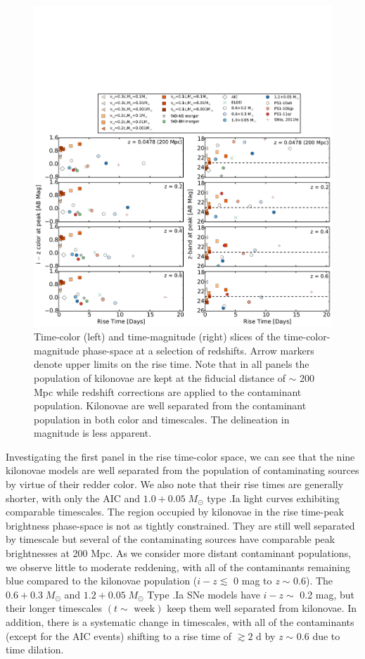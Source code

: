 \begin{figure}[t!]
\centering
\includegraphics[trim= 0 0 0 250 ,clip,width=\textwidth]{./figs/chapter2/ch2_f3.pdf}
\caption{Time-color (left) and time-magnitude (right) slices of the time-color-magnitude phase-space at a selection of redshifts. Arrow markers denote upper limits on the rise time. Note that in all panels the population of kilonovae are kept at the fiducial distance of $\sim$ 200 Mpc while redshift corrections are applied to the contaminant population. Kilonovae are well separated from the contaminant population in both color and timescales. The delineation in magnitude is less apparent.}
\label{fig:ch2_phase}
\end{figure}

Investigating the first panel in the rise time-color space, we can see that the nine kilonovae models are well separated from the population of contaminating sources by virtue of their redder color. We also note that their rise times are generally shorter, with only the AIC and $1.0+0.05\;M_{\odot}$ type .Ia light curves exhibiting comparable timescales. The region occupied by kilonovae in the rise time-peak brightness phase-space is not as tightly constrained. They are still well separated by timescale but several of the contaminating sources have comparable peak brightnesses at 200 Mpc. As we consider more distant contaminant populations, we observe little to moderate reddening, with all of the contaminants remaining blue compared to the kilonovae population ($i-z\lesssim$ 0 mag to {\em z} $\sim$ 0.6). The $0.6+0.3\;M_{\odot}$ and $1.2+0.05\;M_{\odot}$ Type .Ia SNe models have $i-z\sim$ 0.2 mag, but their longer timescales $(t\sim\text{ week})$ keep them well separated from kilonovae. In addition, there is a systematic change in timescales, with all of the contaminants (except for the AIC events) shifting to a rise time of $\gtrsim  2$ d by {\em z} $\sim$ 0.6 due to time dilation.

